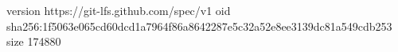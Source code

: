 version https://git-lfs.github.com/spec/v1
oid sha256:1f5063e065cd60dcd1a7964f86a8642287e5c32a52e8ee3139dc81a549cdb253
size 174880
